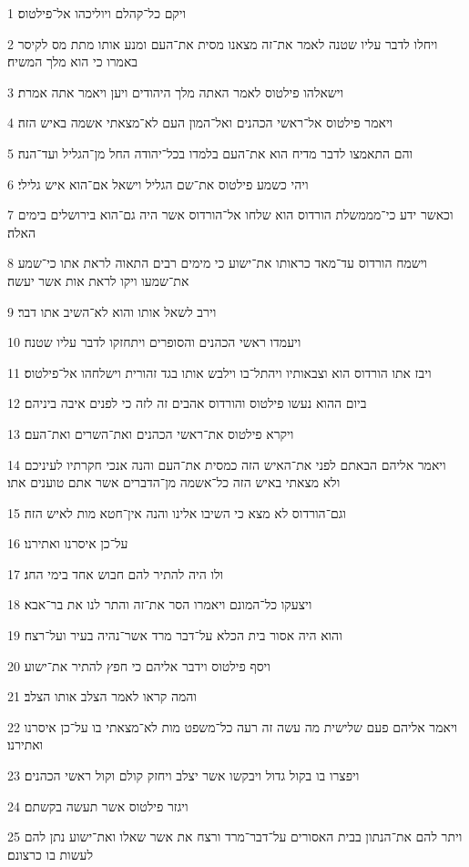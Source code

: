 \par 1 ויקם כל־קהלם ויוליכהו אל־פילטוס׃
\par 2 ויחלו לדבר עליו שטנה לאמר את־זה מצאנו מסית את־העם ומנע אותו מתת מס לקיסר באמרו כי הוא מלך המשיח׃
\par 3 וישאלהו פילטוס לאמר האתה מלך היהודים ויען ויאמר אתה אמרת׃
\par 4 ויאמר פילטוס אל־ראשי הכהנים ואל־המון העם לא־מצאתי אשמה באיש הזה׃
\par 5 והם התאמצו לדבר מדיח הוא את־העם בלמדו בכל־יהודה החל מן־הגליל ועד־הנה׃
\par 6 ויהי כשמע פילטוס את־שם הגליל וישאל אם־הוא איש גלילי׃
\par 7 וכאשר ידע כי־מממשלת הורדוס הוא שלחו אל־הורדוס אשר היה גם־הוא בירושלים בימים האלה׃
\par 8 וישמח הורדוס עד־מאד כראותו את־ישוע כי מימים רבים התאוה לראת אתו כי־שמע את־שמעו ויקו לראת אות אשר יעשה׃
\par 9 וירב לשאל אותו והוא לא־השיב אתו דבר׃
\par 10 ויעמדו ראשי הכהנים והסופרים ויתחזקו לדבר עליו שטנה׃
\par 11 ויבז אתו הורדוס הוא וצבאותיו ויהתל־בו וילבש אותו בגד זהורית וישלחהו אל־פילטוס׃
\par 12 ביום ההוא נעשו פילטוס והורדוס אהבים זה לזה כי לפנים איבה ביניהם׃
\par 13 ויקרא פילטוס את־ראשי הכהנים ואת־השרים ואת־העם׃
\par 14 ויאמר אליהם הבאתם לפני את־האיש הזה כמסית את־העם והנה אנכי חקרתיו לעיניכם ולא מצאתי באיש הזה כל־אשמה מן־הדברים אשר אתם טוענים אתו׃
\par 15 וגם־הורדוס לא מצא כי השיבו אלינו והנה אין־חטא מות לאיש הזה׃
\par 16 על־כן איסרנו ואתירנו׃
\par 17 ולו היה להתיר להם חבוש אחד בימי החג׃
\par 18 ויצעקו כל־המונם ויאמרו הסר את־זה והתר לנו את בר־אבא׃
\par 19 והוא היה אסור בית הכלא על־דבר מרד אשר־נהיה בעיר ועל־רצח׃
\par 20 ויסף פילטוס וידבר אליהם כי חפץ להתיר את־ישוע׃
\par 21 והמה קראו לאמר הצלב אותו הצלב׃
\par 22 ויאמר אליהם פעם שלישית מה עשה זה רעה כל־משפט מות לא־מצאתי בו על־כן איסרנו ואתירנו׃
\par 23 ויפצרו בו בקול גדול ויבקשו אשר יצלב ויחזק קולם וקול ראשי הכהנים׃
\par 24 ויגזר פילטוס אשר תעשה בקשתם׃
\par 25 ויתר להם את־הנתון בבית האסורים על־דבר־מרד ורצח את אשר שאלו ואת־ישוע נתן להם לעשות בו כרצונם׃
